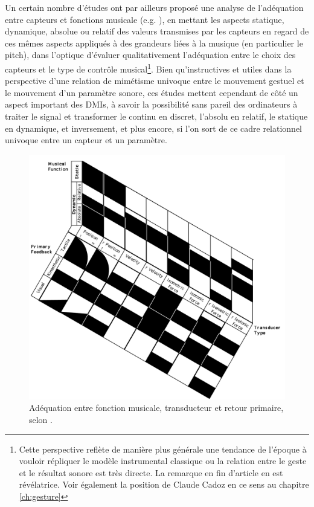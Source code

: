 \indent Un certain nombre d'études ont par ailleurs proposé une analyse de l'adéquation entre capteurs et fonctions musicale (e.g. \cite{vertegaal_towards_1996, goudeseune_interpolated_2002}), en mettant les aspects statique, dynamique, absolue ou relatif des valeurs transmises par les capteurs en regard de ces mêmes aspects appliqués à des grandeurs liées à la musique (en particulier le pitch), dans l'optique d'évaluer qualitativement l'adéquation entre le choix des capteurs et le type de contrôle musical\footnote{Cette perspective reflète de manière plus générale une tendance de l'époque à vouloir répliquer le modèle instrumental classique ou la relation entre le geste et le résultat sonore est très directe. La remarque en fin d'article  en est révélatrice. Voir également la position de Claude Cadoz en ce sens au chapitre \ref{ch:gesture}}. Bien qu'instructives et utiles dans la perspective d'une relation de mimétisme univoque entre le mouvement gestuel et le mouvement d'un paramètre sonore, ces études mettent cependant de côté un aspect important des \glspl{DMI}, à savoir la possibilité sans pareil des ordinateurs à traiter le signal et transformer le continu en discret, l'absolu en relatif, le statique en dynamique, et inversement, et plus encore, si l'on sort de ce cadre relationnel univoque entre un capteur et un paramètre.\\
\begin{figure}[!htbp]
	\captionsetup{format=plain}%
	\includegraphics[width=\textwidth]{gfx/05_interfaces/vertegaal-musical-function.png}
	\caption[Adéquation entre fonction musicale, transducteur et retour primaire]{Adéquation entre fonction musicale, transducteur et retour primaire, selon \cite{vertegaal_towards_1996}.}
	\label{fig:interface:vertegaal-transducer-function}
\end{figure}
